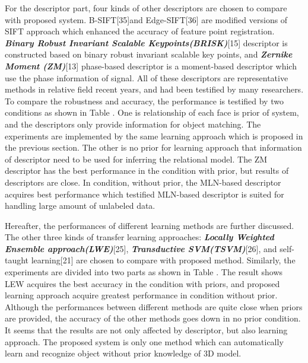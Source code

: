 \documentclass{tADR2e}
\begin{document}
For the descriptor part, four kinds of other descriptors are chosen to compare with proposed system. B-SIFT[35]and Edge-SIFT[36] are modified versions of SIFT approach which enhanced the accuracy of feature point registration.  \textbf{\textit{Binary Robust Invariant Scalable Keypoints(BRISK)}}[15] descriptor is constructed based on binary robust invariant scalable key points, and \textbf{\textit{Zernike Moment (ZM)}}[13] phase-based descriptor is a moment-based descriptor which use the phase information of signal. All of these descriptors are representative methods in relative field recent years, and had been testified by many researchers. To compare the robustness and accuracy, the performance is testified by two conditions as shown in Table \uppercase\expandafter{}. One is relationship of each face is prior of system, and the descriptors only provide information for object matching. The experiments are implemented by the same learning approach which is proposed in the previous section. The other is no prior for learning approach that information of descriptor need to be used for inferring the relational model. The ZM descriptor has the best performance in the condition with prior, but results of descriptors are close. In condition, without prior, the MLN-based descriptor acquires best performance which testified MLN-based descriptor is suited for handling large amount of unlabeled data. 

Hereafter, the performances of different learning methods are further discussed. The other three kinds of transfer learning approaches: \textbf{\textit{Locally Weighted Ensemble approach(LWE)}}[25], \textbf{\textit{Transductive SVM(TSVM)}}[26], and self-taught learning[21] are chosen to compare with proposed method. Similarly, the experiments are divided into two parts as shown in Table \uppercase\expandafter{}. The result shows LEW acquires the best accuracy in the condition with priors, and proposed learning approach acquire greatest performance in condition without prior. Although the performances between different methods are quite close when priors are provided, the accuracy of the other methods goes down in no prior condition. It seems that the results are not only affected by descriptor, but also learning approach. The proposed system is only one method which can automatically learn and recognize object without prior knowledge of 3D model. 
\end{document}
